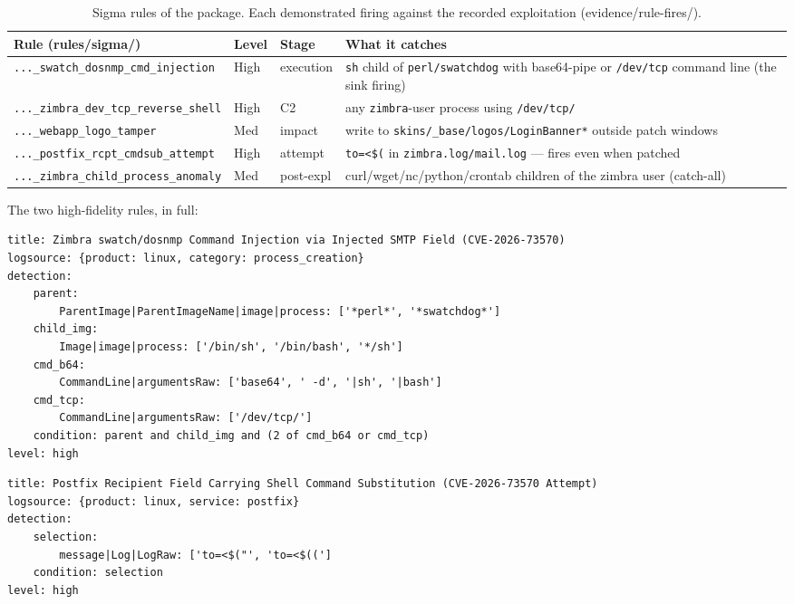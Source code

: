 \documentclass[journal]{IEEEtran}
\begin{document}
\begin{table}[t]
\centering
\footnotesize
\begin{tabular}{p{5.6cm}llp{5.6cm}}
\toprule
Rule (rules/sigma/) & Level & Stage & What it catches \\
\midrule
\texttt{...\_swatch\_dosnmp\_cmd\_injection} & High & execution &
  \texttt{sh} child of \texttt{perl/swatchdog} with base64-pipe or
  \texttt{/dev/tcp} command line (the sink firing) \\
\texttt{...\_zimbra\_dev\_tcp\_reverse\_shell} & High & C2 &
  any \texttt{zimbra}-user process using \texttt{/dev/tcp/} \\
\texttt{...\_webapp\_logo\_tamper} & Med & impact &
  write to \texttt{skins/\_base/\hspace{0pt}logos/LoginBanner*} outside patch windows \\
\texttt{...\_postfix\_rcpt\_cmdsub\_attempt} & High & attempt &
  \texttt{to=<\$(} in \texttt{zimbra.log/\hspace{0pt}mail.log} — fires even when patched \\
\texttt{...\_zimbra\_child\_process\_anomaly} & Med & post-expl &
  curl/wget/nc/python/crontab children of the zimbra user (catch-all) \\
\bottomrule
\end{tabular}
\caption{Sigma rules of the package. Each demonstrated firing against the
recorded exploitation (evidence/rule-fires/).}
\label{tab:rules}
\end{table}

The two high-fidelity rules, in full:

\begin{lstlisting}[style=yargen,caption={Rule: swatch/dosnmp command injection (sink firing)}]
title: Zimbra swatch/dosnmp Command Injection via Injected SMTP Field (CVE-2026-73570)
logsource: {product: linux, category: process_creation}
detection:
    parent:
        ParentImage|ParentImageName|image|process: ['*perl*', '*swatchdog*']
    child_img:
        Image|image|process: ['/bin/sh', '/bin/bash', '*/sh']
    cmd_b64:
        CommandLine|argumentsRaw: ['base64', ' -d', '|sh', '|bash']
    cmd_tcp:
        CommandLine|argumentsRaw: ['/dev/tcp/']
    condition: parent and child_img and (2 of cmd_b64 or cmd_tcp)
level: high
\end{lstlisting}

\begin{lstlisting}[style=yargen,caption={Rule: RCPT attempt in mail logs (fires even on patched hosts)}]
title: Postfix Recipient Field Carrying Shell Command Substitution (CVE-2026-73570 Attempt)
logsource: {product: linux, service: postfix}
detection:
    selection:
        message|Log|LogRaw: ['to=<$("', 'to=<$((']
    condition: selection
level: high
\end{lstlisting}
\end{document}
